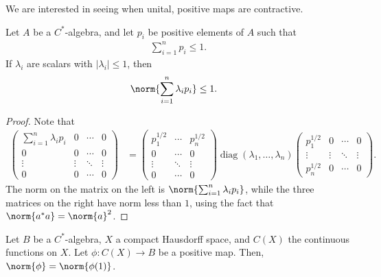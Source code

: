 \documentclass[10pt]{mypackage}
\begin{document}
We are interested in seeing when unital, positive maps are contractive.
\begin{lemma}
  Let $A$ be a $C^{\ast}$-algebra, and let $p_i$ be positive elements of $A$ such that
  \begin{align*}
    \sum_{i=1}^{n}p_i \leq 1.
  \end{align*}
  If $\lambda_i$ are scalars with $\left\vert \lambda_i \right\vert \leq 1$, then
  \begin{align*}
    \norm{\sum_{i=1}^{n}\lambda_ip_i} &\leq 1.
  \end{align*}
\end{lemma}
\begin{proof}
  Note that
  \begin{align*}
    \begin{pmatrix}\sum_{i=1}^{n}\lambda_ip_i & 0 & \cdots & 0 \\ 0 & 0 & \cdots & 0 \\ \vdots & \vdots & \ddots & \vdots \\ 0 & 0 & \cdots & 0 \end{pmatrix} &= \begin{pmatrix}p_1^{1/2} &\cdots & p_n^{1/2} \\ 0 & \cdots & 0 \\ \vdots & \ddots & \vdots \\ 0 & \cdots & 0\end{pmatrix} \operatorname{diag}\left( \lambda_1,\dots,\lambda_n \right) \begin{pmatrix}p_1^{1/2} & 0 & \cdots & 0 \\ \vdots & \vdots & \ddots & \vdots \\ p_n^{1/2} & 0 & \cdots & 0\end{pmatrix}.
  \end{align*}
  The norm on the matrix on the left is $\norm{\sum_{i=1}^{n}\lambda_ip_i}$, while the three matrices on the right have norm less than $1$, using the fact that $\norm{a^{\ast}a} = \norm{a}^2$.
\end{proof}
\begin{theorem}
  Let $B$ be a $C^{\ast}$-algebra, $X$ a compact Hausdorff space, and $C(X)$ the continuous functions on $X$. Let $\phi\colon C(X)\rightarrow B$ be a positive map. Then, $\norm{\phi} = \norm{\phi(1)}$.
\end{theorem}
\end{document}
